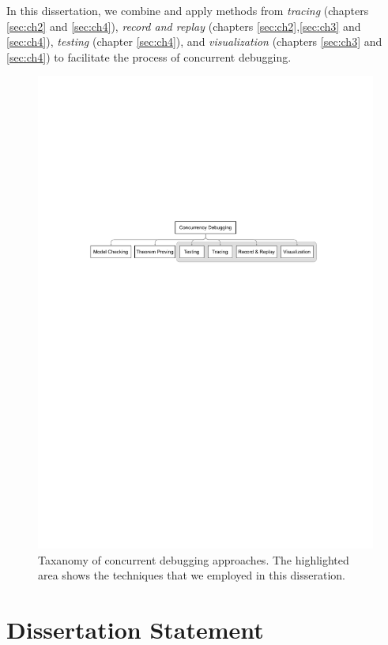 In this dissertation, we combine and apply methods from \textit{tracing} (chapters \ref{sec:ch2} and \ref{sec:ch4}), \textit{record and replay} (chapters \ref{sec:ch2},\ref{sec:ch3} and \ref{sec:ch4}), \textit{testing} (chapter \ref{sec:ch4}), and \textit{visualization} (chapters \ref{sec:ch3} and \ref{sec:ch4}) to facilitate the process of concurrent debugging.
\begin{figure}[t]
\centering
\includegraphics[width=1\textwidth]{dissertation_intro_approaches2.pdf}
\caption{Taxanomy of concurrent debugging approaches. The highlighted area shows the techniques that we employed in this disseration.}
\label{fig:ch1_concDebugging}
\end{figure}



\section{Dissertation Statement}

